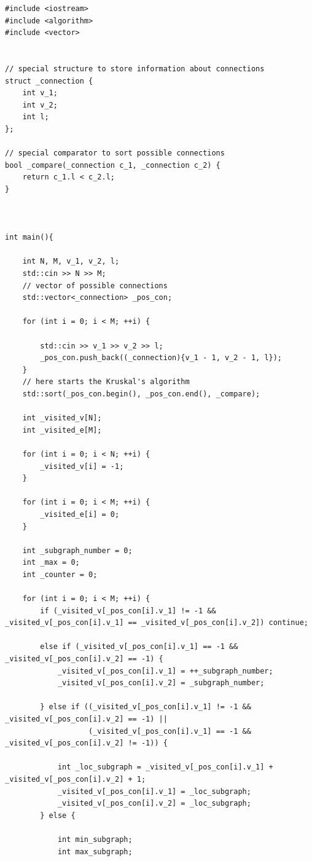 \documentclass[a5paper, 10pt]{article}
\theoremstyle{definition}
\theoremstyle{plain}
\theoremstyle{remark}
\begin{document}
\begin{center}
\begin{lstlisting}[label=some-code,caption={Исходный код для 1160}]
#include <iostream>
#include <algorithm>
#include <vector>


// special structure to store information about connections
struct _connection {
    int v_1;
    int v_2;
    int l;
};

// special comparator to sort possible connections
bool _compare(_connection c_1, _connection c_2) {
    return c_1.l < c_2.l;
}



int main(){

    int N, M, v_1, v_2, l;
    std::cin >> N >> M;
    // vector of possible connections
    std::vector<_connection> _pos_con;

    for (int i = 0; i < M; ++i) {

        std::cin >> v_1 >> v_2 >> l;
        _pos_con.push_back((_connection){v_1 - 1, v_2 - 1, l});
    }
    // here starts the Kruskal's algorithm
    std::sort(_pos_con.begin(), _pos_con.end(), _compare);

    int _visited_v[N];
    int _visited_e[M];

    for (int i = 0; i < N; ++i) {
        _visited_v[i] = -1;
    }

    for (int i = 0; i < M; ++i) {
        _visited_e[i] = 0;
    }

    int _subgraph_number = 0;
    int _max = 0;
    int _counter = 0;

    for (int i = 0; i < M; ++i) {
        if (_visited_v[_pos_con[i].v_1] != -1 && _visited_v[_pos_con[i].v_1] == _visited_v[_pos_con[i].v_2]) continue;

        else if (_visited_v[_pos_con[i].v_1] == -1 && _visited_v[_pos_con[i].v_2] == -1) {
            _visited_v[_pos_con[i].v_1] = ++_subgraph_number;
            _visited_v[_pos_con[i].v_2] = _subgraph_number;

        } else if ((_visited_v[_pos_con[i].v_1] != -1 && _visited_v[_pos_con[i].v_2] == -1) ||
                   (_visited_v[_pos_con[i].v_1] == -1 && _visited_v[_pos_con[i].v_2] != -1)) {

            int _loc_subgraph = _visited_v[_pos_con[i].v_1] + _visited_v[_pos_con[i].v_2] + 1;
            _visited_v[_pos_con[i].v_1] = _loc_subgraph;
            _visited_v[_pos_con[i].v_2] = _loc_subgraph;
        } else {

            int min_subgraph;
            int max_subgraph;


\end{lstlisting}
\end{center}
\end{document}
